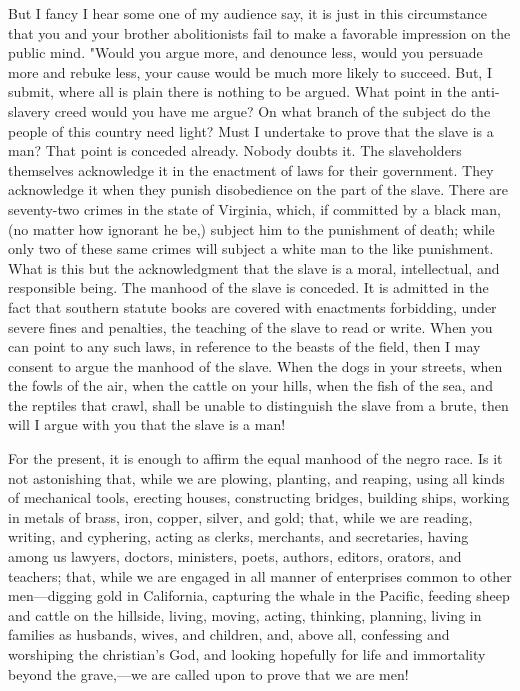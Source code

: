 But I fancy I hear some one of my audience say, it is just in this
circumstance that you and your brother abolitionists fail to make a
favorable impression on the public mind. "Would you argue more, and
denounce less, would you persuade more and rebuke less, your cause would
be much more likely to succeed. But, I submit, where all is plain there
is nothing to be argued. What point in the anti-slavery creed would you
have me argue? On what branch of the subject do the people of this
country need light? Must I undertake to prove that the slave is a man?
That point is conceded already. Nobody doubts it. The slaveholders
themselves acknowledge it in the enactment of laws for their government.
They acknowledge it when they punish disobedience on the part of the
slave. There are seventy-two crimes in the state of Virginia, which, if
committed by a black man, (no matter how ignorant he be,) subject him to
the punishment of death; while only two of these same crimes will
subject a white man to the like punishment. What is this but the
acknowledgment that the slave is a moral, intellectual, and responsible
being. The manhood of the slave is conceded. It is admitted in the fact
that southern statute books are covered with enactments forbidding,
under severe fines and penalties, the teaching of the slave to read or
write. When you can point to any such laws, in reference to the beasts
of the field, then I may consent to argue the manhood of the slave. When
the dogs in your streets, when the fowls of the air, when the cattle on
your hills, when the fish of the sea, and the reptiles that crawl, shall
be unable to distinguish the slave from a brute, then will I argue with
you that the slave is a man!

For the present, it is enough to affirm the equal manhood of the negro
race. Is it not astonishing that, while we are plowing, planting, and
reaping, using all kinds of mechanical tools, erecting houses,
constructing bridges, building ships, working in metals of brass, iron,
copper, silver, and gold; that, while we are reading, writing, and
cyphering, acting as clerks, merchants, and secretaries, having among us
lawyers, doctors, ministers, poets, authors, editors, orators, and
teachers; that, while we are engaged in all manner of enterprises common
to other men---digging gold in California, capturing the whale in the
Pacific, feeding sheep and cattle on the
{\protect\hypertarget{444}{}{}}hillside, living, moving, acting,
thinking, planning, living in families as husbands, wives, and children,
and, above all, confessing and worshiping the christian's God, and
looking hopefully for life and immortality beyond the grave,---we are
called upon to prove that we are men!

